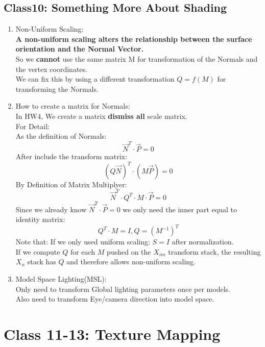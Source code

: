 \documentclass[cyan,normal,en]{elegantnote}
\begin{document}
\subsection{Class10: Something More About Shading}
\begin{enumerate}
	\item Non-Uniform Scaling: \\
	\textbf{A non-uniform scaling alters the relationship between the surface orientation and the Normal Vector.}\\
	So we \textbf{cannot} use the same matrix M for transformation of the Normals and the vertex coordinates.\\
	We can fix this by using a different transformation $Q=f(M)$ for transforming the Normals.
	\item How to create a matrix for Normals:\\
	In HW4, We create a matrix \textbf{dismiss all} scale matrix.\\
	For Detail:\\
	As the definition of Normals: 
	$$\vec{N}^T\cdot\vec{P}=0$$
	After include the transform matrix: 
	$$(Q\vec{N})^T\cdot(M\vec{P})=0$$
	By Definition of Matrix Multiplyer:
	$$\vec{N}^T \cdot Q^T \cdot M \cdot \vec{P}=0$$
	Since we already know $\vec{N}^T\cdot\vec{P}=0$ we only need the inner part equal to identity matrix:
	$$Q^T \cdot M= I,Q=(M^{-1})^T$$
	Note that: If we only used uniform scaling: $S=I$ after normalization.\\
	If we compute $Q$ for each $M$ pushed on the $X_{im}$ transform stack, the resulting $X_n$ stack has $Q$ and therefore allows non-uniform scaling.	
	\item Model Space Lighting(MSL): \\
	Only need to transform Global lighting parameters once per models.\\
	Also need to transform Eye/camera direction into model space.
\end{enumerate}
\newpage

\section{Class 11-13: Texture Mapping}
\end{document}
